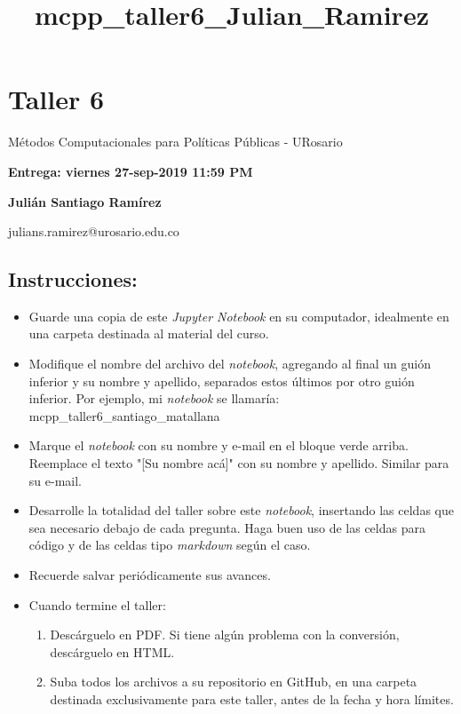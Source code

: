 \documentclass[11pt]{article}
\title{mcpp\_taller6\_Julian\_Ramirez}
\providecommand{\tightlist}{%
      \setlength{\itemsep}{0pt}\setlength{\parskip}{0pt}}
\begin{document}
    
    
    \maketitle
    
    

    
    \section{Taller 6}\label{taller-6}

Métodos Computacionales para Políticas Públicas - URosario

\textbf{Entrega: viernes 27-sep-2019 11:59 PM}

    \textbf{Julián Santiago Ramírez}

julians.ramirez@urosario.edu.co

    \subsection{Instrucciones:}\label{instrucciones}

\begin{itemize}
\tightlist
\item
  Guarde una copia de este \emph{Jupyter Notebook} en su computador,
  idealmente en una carpeta destinada al material del curso.
\item
  Modifique el nombre del archivo del \emph{notebook}, agregando al
  final un guión inferior y su nombre y apellido, separados estos
  últimos por otro guión inferior. Por ejemplo, mi \emph{notebook} se
  llamaría: mcpp\_taller6\_santiago\_matallana
\item
  Marque el \emph{notebook} con su nombre y e-mail en el bloque verde
  arriba. Reemplace el texto "{[}Su nombre acá{]}" con su nombre y
  apellido. Similar para su e-mail.
\item
  Desarrolle la totalidad del taller sobre este \emph{notebook},
  insertando las celdas que sea necesario debajo de cada pregunta. Haga
  buen uso de las celdas para código y de las celdas tipo
  \emph{markdown} según el caso.
\item
  Recuerde salvar periódicamente sus avances.
\item
  Cuando termine el taller:

  \begin{enumerate}
  \def\labelenumi{\arabic{enumi}.}
  \tightlist
  \item
    Descárguelo en PDF. Si tiene algún problema con la conversión,
    descárguelo en HTML.
  \item
    Suba todos los archivos a su repositorio en GitHub, en una carpeta
    destinada exclusivamente para este taller, antes de la fecha y hora
    límites.
  \end{enumerate}
\end{itemize}
\end{document}
